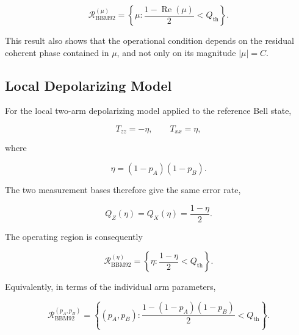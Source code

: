 \begin{equation}
\boxed{
\mathcal{R}_{\mathrm{BBM92}}^{(\mu)}
=
\left\{
\mu:
\frac{
1-\operatorname{Re}(\mu)
}{2}
<
Q_{\mathrm{th}}
\right\}.
}
\label{eq:bbm92_region_statistical_phase}
\end{equation}

This result also shows that the operational condition depends on the residual
coherent phase contained in \(\mu\), and not only on its magnitude
\( |\mu|=C \).


\subsection{Local Depolarizing Model}
\label{subsec:bbm92_region_local_depolarization}

For the local two-arm depolarizing model applied to the reference Bell state,

\begin{equation}
T_{zz}
=
-\eta,
\qquad
T_{xx}
=
\eta,
\end{equation}

where

\begin{equation}
\eta
=
(1-p_A)(1-p_B).
\end{equation}

The two measurement bases therefore give the same error rate,

\begin{equation}
Q_Z(\eta)
=
Q_X(\eta)
=
\frac{1-\eta}{2}.
\label{eq:bbm92_qber_local_depolarization}
\end{equation}

The operating region is consequently

\begin{equation}
\boxed{
\mathcal{R}_{\mathrm{BBM92}}^{(\eta)}
=
\left\{
\eta:
\frac{1-\eta}{2}
<
Q_{\mathrm{th}}
\right\}.
}
\label{eq:bbm92_region_local_depolarization}
\end{equation}

Equivalently, in terms of the individual arm parameters,

\begin{equation}
\mathcal{R}_{\mathrm{BBM92}}^{(p_A,p_B)}
=
\left\{
(p_A,p_B):
\frac{
1-(1-p_A)(1-p_B)
}{2}
<
Q_{\mathrm{th}}
\right\}.
\label{eq:bbm92_region_local_depolarization_arm_parameters}
\end{equation}

